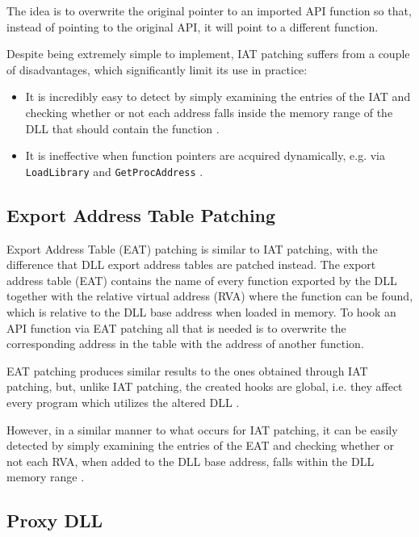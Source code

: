 The idea is to overwrite the original pointer to an imported API function so that, instead of pointing to the original API, it will point to a different function.

\newpage

Despite being extremely simple to implement, IAT patching suffers from a couple of disadvantages, which significantly limit its use in practice:
\begin{itemize}
    \item It is incredibly easy to detect by simply examining the entries of the IAT and checking whether or not each address falls inside the memory range of the DLL that should contain the function \cite{HookingDetection}.
    \item It is ineffective when function pointers are acquired dynamically, e.g. via \texttt{LoadLibrary} and \texttt{GetProcAddress} \cite{Buescher:2011:BIS:2186328.2186347}.
\end{itemize}

\subsection{Export Address Table Patching}

Export Address Table (EAT) patching is similar to IAT patching, with the difference that DLL export address tables are patched instead. The export address table (EAT) contains the name of every function exported by the DLL together with the relative virtual address (RVA) where the function can be found, which is relative to the DLL base address when loaded in memory. To hook an API function via EAT patching all that is needed is to overwrite the corresponding address in the table with the address of another function.

EAT patching produces similar results to the ones obtained through IAT patching, but, unlike IAT patching, the created hooks are global, i.e. they affect every program which utilizes the altered DLL \cite{Berdajs:2010:EAU:1815744.1815746}.

However, in a similar manner to what occurs for IAT patching, it can be easily detected by simply examining the entries of the EAT and checking whether or not each RVA, when added to the DLL base address, falls within the DLL memory range \cite{Stuttard:2014:ADC:2616217}.

\subsection{Proxy DLL}

